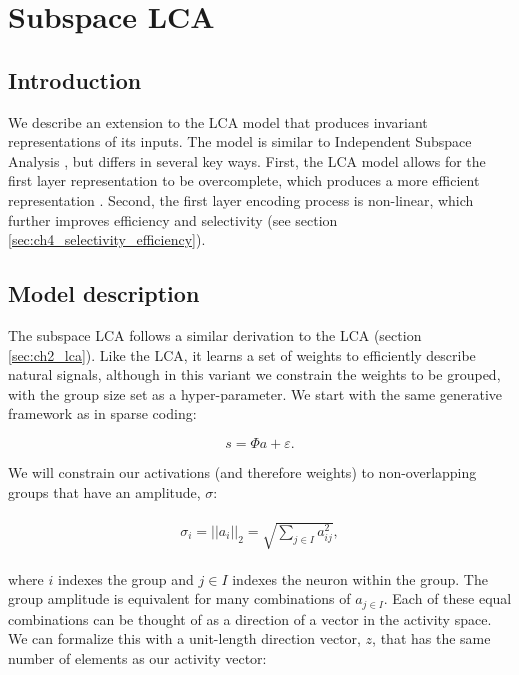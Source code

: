 \section{Subspace LCA}\label{sec:ch3_subspace_lca}
\subsection{Introduction}
We describe an extension to the LCA model that produces invariant representations of its inputs. The model is similar to Independent Subspace Analysis \parencite{hyvarinen2000emergence}, but differs in several key ways. First, the LCA model allows for the first layer representation to be overcomplete, which produces a more efficient representation \parencite{lewicki2000learning}. Second, the first layer encoding process is non-linear, which further improves efficiency and selectivity (see section \ref{sec:ch4_selectivity_efficiency}).

\subsection{Model description}
The subspace LCA follows a similar derivation to the LCA (section \ref{sec:ch2_lca}). Like the LCA, it learns a set of weights to efficiently describe natural signals, although in this variant we constrain the weights to be grouped, with the group size set as a hyper-parameter. We start with the same generative framework as in sparse coding:

\begin{equation} \label{eq:ch3_slcagenerative_model}
    s = \Phi a + \varepsilon.
\end{equation}

We will constrain our activations (and therefore weights) to non-overlapping groups that have an amplitude, $\sigma$:

\begin{align}\label{eq:ch3_a_decomp}
\begin{split}
  \sigma_{i} = ||a_{i}||_{2} = \sqrt{\sum_{j\in I}a^{2}_{ij}},
\end{split}
\end{align}

\noindent where $i$ indexes the group and $j \in I$ indexes the neuron within the group. The group amplitude is equivalent for many combinations of $a_{j \in I}$. Each of these equal combinations can be thought of as a direction of a vector in the activity space. We can formalize this with a unit-length direction vector, $z$, that has the same number of elements as our activity vector:

